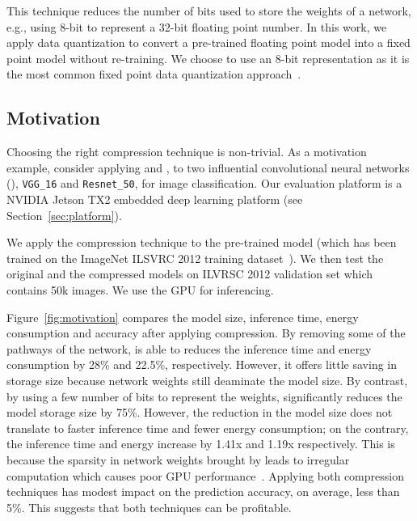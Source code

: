  This technique reduces the number of bits used to store the weights of a network, e.g., using 8-bit to
represent a 32-bit floating point number. In this work, we apply data quantization to convert a pre-trained floating point model into a
fixed point model without re-training. We choose to use an 8-bit representation as it is the most common fixed point data quantization
approach~\FIXME{\cite{}}.



\subsection{Motivation}
Choosing the right compression technique is non-trivial. As a motivation example, consider applying \pruning and \dquantization, to two
influential convolutional neural networks (\CNN), \texttt{VGG\_16} 	and \texttt{Resnet\_50}, for image classification. Our evaluation
platform is a NVIDIA Jetson TX2 embedded deep learning platform (see Section~\ref{sec:platform}).

 We apply the compression technique to the pre-trained model (which has been trained on the ImageNet ILSVRC 2012
training dataset~\cite{imagenet2012}). We then test the original and the compressed models on ILVRSC 2012 validation set which contains 50k
images. We use the GPU for inferencing.

 Figure~\ref{fig:motivation} compares the model size, inference time, energy consumption and accuracy after
applying compression. By removing some of the pathways of the network, \pruning is able to reduces the inference time and energy
consumption by 28\% and 22.5\%, respectively. However, it offers little saving in storage size because network weights still deaminate the
model size. By contrast, by using a few number of bits to represent the weights, \quantization significantly reduces the model storage size
by 75\%. However, the reduction in the model size does not translate to faster inference time and fewer energy consumption; on the
contrary, the inference time and energy increase by 1.41x and 1.19x respectively.
This is because the sparsity in network
weights brought by \quantization leads to irregular computation which causes poor GPU performance~\cite{}.
Applying both compression
techniques has modest impact on the prediction accuracy, on average, less than 5\%. This suggests that both techniques can be profitable.


